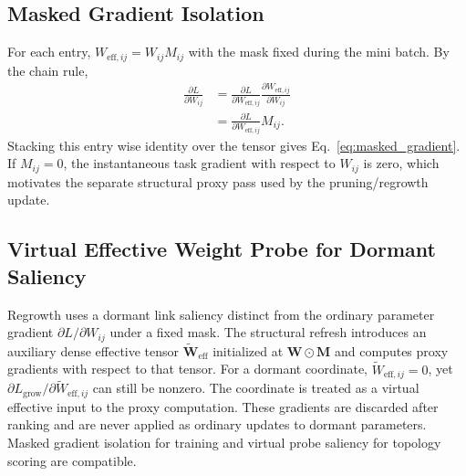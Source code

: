 \documentclass[letterpaper]{article}
\begin{document}
\subsection{Masked Gradient Isolation}
For each entry, $W_{\text{eff},ij}=W_{ij}M_{ij}$ with the mask fixed during the mini batch. By the chain rule,
\begin{equation}
\begin{aligned}
    \frac{\partial L}{\partial W_{ij}}
    &=\frac{\partial L}{\partial W_{\mathrm{eff},ij}}
    \frac{\partial W_{\mathrm{eff},ij}}{\partial W_{ij}}\\
    &=\frac{\partial L}{\partial W_{\mathrm{eff},ij}}M_{ij}.
\end{aligned}
\end{equation}
Stacking this entry wise identity over the tensor gives Eq.~\ref{eq:masked_gradient}. If $M_{ij}=0$, the instantaneous task gradient with respect to $W_{ij}$ is zero, which motivates the separate structural proxy pass used by the pruning/regrowth update.

\subsection{Virtual Effective Weight Probe for Dormant Saliency}
\label{app:virtual_probe_note}
Regrowth uses a dormant link saliency distinct from the ordinary parameter gradient $\partial L/\partial W_{ij}$ under a fixed mask. The structural refresh introduces an auxiliary dense effective tensor $\widetilde{\bm{W}}_{\text{eff}}$ initialized at $\bm{W}\odot\bm{M}$ and computes proxy gradients with respect to that tensor. For a dormant coordinate, $\widetilde{W}_{\text{eff},ij}=0$, yet $\partial L_{\text{grow}}/\partial \widetilde{W}_{\text{eff},ij}$ can still be nonzero. The coordinate is treated as a virtual effective input to the proxy computation. These gradients are discarded after ranking and are never applied as ordinary updates to dormant parameters. Masked gradient isolation for training and virtual probe saliency for topology scoring are compatible.
\end{document}
